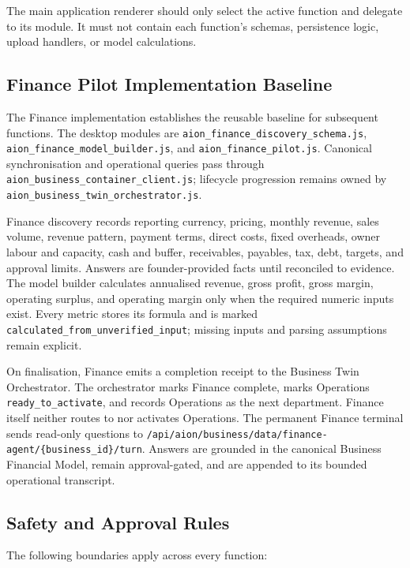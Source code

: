The main application renderer should only select the active function and delegate
to its module. It must not contain each function's schemas, persistence logic,
upload handlers, or model calculations.

\subsection{Finance Pilot Implementation Baseline}

The Finance implementation establishes the reusable baseline for subsequent
functions. The desktop modules are
\texttt{aion\_finance\_discovery\_schema.js},
\texttt{aion\_finance\_model\_builder.js}, and
\texttt{aion\_finance\_pilot.js}. Canonical synchronisation and operational
queries pass through \texttt{aion\_business\_container\_client.js}; lifecycle
progression remains owned by
\texttt{aion\_business\_twin\_orchestrator.js}.

Finance discovery records reporting currency, pricing, monthly revenue, sales
volume, revenue pattern, payment terms, direct costs, fixed overheads, owner
labour and capacity, cash and buffer, receivables, payables, tax, debt, targets,
and approval limits. Answers are founder-provided facts until reconciled to
evidence. The model builder calculates annualised revenue, gross profit, gross
margin, operating surplus, and operating margin only when the required numeric
inputs exist. Every metric stores its formula and is marked
\texttt{calculated\_from\_unverified\_input}; missing inputs and parsing
assumptions remain explicit.

On finalisation, Finance emits a completion receipt to the Business Twin
Orchestrator. The orchestrator marks Finance complete, marks Operations
\texttt{ready\_to\_activate}, and records Operations as the next department.
Finance itself neither routes to nor activates Operations. The permanent
Finance terminal sends read-only questions to
\texttt{/api/aion/business/data/finance-agent/\{business\_id\}/turn}. Answers
are grounded in the canonical Business Financial Model, remain approval-gated,
and are appended to its bounded operational transcript.

\subsection{Safety and Approval Rules}

The following boundaries apply across every function:

